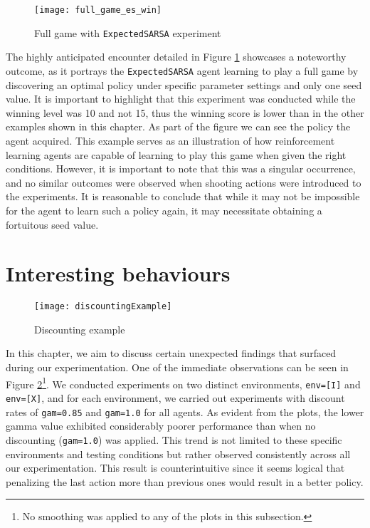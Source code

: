 \begin{figure}[h]
    \centering
    \texttt{[image: full\_game\_es\_win]}
    \caption{Full game with \texttt{ExpectedSARSA} experiment}
    \label{fig:full_game_es_eg}
\end{figure}

The highly anticipated encounter detailed in Figure \ref{fig:full_game_es_eg} showcases a noteworthy outcome, as it portrays the \texttt{ExpectedSARSA} agent learning to play a full game by discovering an optimal policy under specific parameter settings and only one seed value. It is important to highlight that this experiment was conducted while the winning level was 10 and not 15, thus the winning score is lower than in the other examples shown in this chapter. As part of the figure we can see the policy the agent acquired. This example serves as an illustration of how reinforcement learning agents are capable of learning to play this game when given the right conditions. However, it is important to note that this was a singular occurrence, and no similar outcomes were observed when shooting actions were introduced to the experiments. It is reasonable to conclude that while it may not be impossible for the agent to learn such a policy again, it may necessitate obtaining a fortuitous seed value.

\section{Interesting behaviours}
\label{intbeh}
\begin{figure}[h]
    \centering
    \texttt{[image: discountingExample]}
    \caption{Discounting example}
    \label{fig:discounting_eg}
\end{figure}

In this chapter, we aim to discuss certain unexpected findings that surfaced during our experimentation. One of the immediate observations can be seen in Figure \ref{fig:discounting_eg}\footnote{No smoothing was applied to any of the plots in this subsection.}. We conducted experiments on two distinct environments, \texttt{env=[I]} and \texttt{env=[X]}, and for each environment, we carried out experiments with discount rates of \texttt{gam=0.85} and \texttt{gam=1.0} for all agents. As evident from the plots, the lower gamma value exhibited considerably poorer performance than when no discounting (\texttt{gam=1.0}) was applied. This trend is not limited to these specific environments and testing conditions but rather observed consistently across all our experimentation. This result is counterintuitive since it seems logical that penalizing the last action more than previous ones would result in a better policy.

